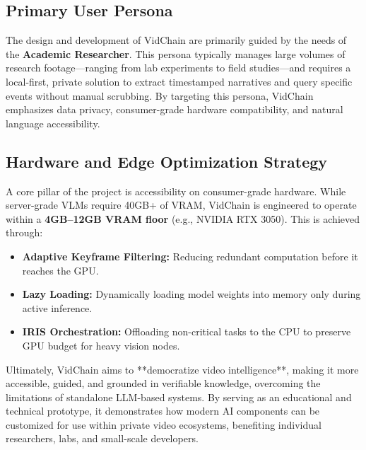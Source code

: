 \subsection{Primary User Persona}
The design and development of VidChain are primarily guided by the needs of the \textbf{Academic Researcher}. This persona typically manages large volumes of research footage—ranging from lab experiments to field studies—and requires a local-first, private solution to extract timestamped narratives and query specific events without manual scrubbing. By targeting this persona, VidChain emphasizes data privacy, consumer-grade hardware compatibility, and natural language accessibility.

\subsection{Hardware and Edge Optimization Strategy}
A core pillar of the project is accessibility on consumer-grade hardware. While server-grade VLMs require 40GB+ of VRAM, VidChain is engineered to operate within a \textbf{4GB--12GB VRAM floor} (e.g., NVIDIA RTX 3050). This is achieved through:
\begin{itemize}
    \item \textbf{Adaptive Keyframe Filtering:} Reducing redundant computation before it reaches the GPU.
    \item \textbf{Lazy Loading:} Dynamically loading model weights into memory only during active inference.
    \item \textbf{IRIS Orchestration:} Offloading non-critical tasks to the CPU to preserve GPU budget for heavy vision nodes.
\end{itemize}

Ultimately, VidChain aims to **democratize video intelligence**, making it more accessible, guided, and grounded in verifiable knowledge, overcoming the limitations of standalone LLM-based systems. By serving as an educational and technical prototype, it demonstrates how modern AI components can be customized for use within private video ecosystems, benefiting individual researchers, labs, and small-scale developers.

